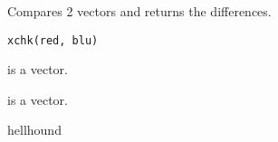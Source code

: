 \documentclass[letterpaper]{book}
\begin{document}
%
\begin{Description}\relax

Compares 2 vectors and returns the differences.
\end{Description}
%
\begin{Usage}
\begin{verbatim}
xchk(red, blu)
\end{verbatim}
\end{Usage}
%
\begin{Arguments}
\begin{ldescription}
\item[\code{red}] 

is a vector. 

\item[\code{blu}] 

is a vector. 

\end{ldescription}
\end{Arguments}
%
\begin{Author}\relax

hellhound
\end{Author}
%
\end{document}
